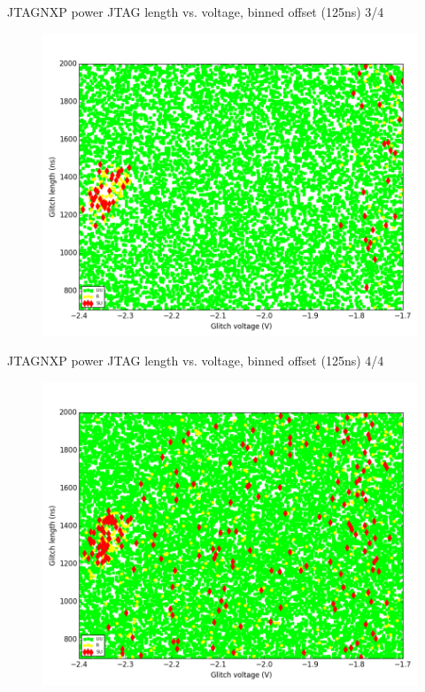 \documentclass[table]{beamer}
\begin{document}
\begin{frame}{JTAG}{NXP power JTAG length vs. voltage, binned offset (125ns) 3/4}
    \vspace{-.3cm}
    \begin{figure}[H]
      \centering
      \includegraphics[width=.8\textwidth]{../../plots/newplots/nxp-jtag-voltage-length-3.png}
    \end{figure}
\end{frame}
\begin{frame}{JTAG}{NXP power JTAG length vs. voltage, binned offset (125ns) 4/4}
    \vspace{-.3cm}
    \begin{figure}[H]
      \centering
      \includegraphics[width=.8\textwidth]{../../plots/newplots/nxp-jtag-voltage-length-4.png}
    \end{figure}
\end{frame}
\end{document}
